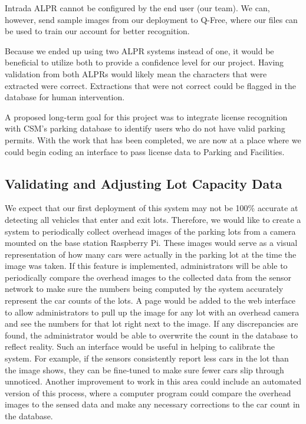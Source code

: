 \documentclass[11pt, oneside, fullpage, doublespace]{article}
\begin{document}
Intrada ALPR cannot be configured by the end user (our team). We can, however, send sample images from our deployment to Q-Free, where our files can be used to train our account for better recognition.

Because we ended up using two ALPR systems instead of one, it would be beneficial to utilize both to provide a confidence level for our project. Having validation from both ALPRs would likely mean the characters that were extracted were correct. Extractions that were not correct could be flagged in the database for human intervention.

A proposed long-term goal for this project was to integrate license recognition with CSM's parking database to identify users who do not have valid parking permits. With the work that has been completed, we are now at a place where we could begin coding an interface to pass license data to Parking and Facilities.

\subsection{Validating and Adjusting Lot Capacity Data}
We expect that our first deployment of this system may not be 100\% accurate at detecting all vehicles that enter and exit lots. Therefore, we would like to create a system to periodically collect overhead images of the parking lots from a camera mounted on the base station Raspberry Pi. These images would serve as a visual representation of how many cars were actually in the parking lot at the time the image was taken. If this feature is implemented, administrators will be able to periodically compare the overhead images to the collected data from the sensor network to make sure the numbers being computed by the system accurately represent the car counts of the lots. A page would be added to the web interface to allow administrators to pull up the image for any lot with an overhead camera and see the numbers for that lot right next to the image. If any discrepancies are found, the administrator would be able to overwrite the count in the database to reflect reality. Such an interface would be useful in helping to calibrate the system. For example, if the sensors consistently report less cars in the lot than the image shows, they can be fine-tuned to make sure fewer cars slip through unnoticed. Another improvement to work in this area could include an automated version of this process, where a computer program could compare the overhead images to the sensed data and make any necessary corrections to the car count in the database.
\end{document}
